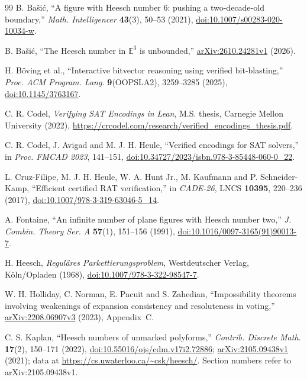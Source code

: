 \documentclass[10pt,a4paper]{article}
\theoremstyle{definition}
\theoremstyle{remark}
\begin{document}
{\raggedright\small
\begin{thebibliography}{99}
B. Ba\v{s}i\'c,
``A figure with Heesch number 6: pushing a two-decade-old boundary,''
\emph{Math. Intelligencer} \textbf{43}(3), 50--53 (2021),
\href{https://doi.org/10.1007/s00283-020-10034-w}{doi:10.1007/s00283-020-10034-w}.

B. Ba\v{s}i\'c,
``The Heesch number in $\mathbb E^3$ is unbounded,''
\href{https://arxiv.org/abs/2610.24281v1}{arXiv:2610.24281v1} (2026).

H. Böving et al.,
``Interactive bitvector reasoning using verified bit-blasting,''
\emph{Proc. ACM Program. Lang.} \textbf{9}(OOPSLA2), 3259--3285 (2025),
\href{https://doi.org/10.1145/3763167}{doi:10.1145/3763167}.

C. R. Codel,
\emph{Verifying SAT Encodings in Lean},
M.S. thesis, Carnegie Mellon University (2022),
\url{https://crcodel.com/research/verified_encodings_thesis.pdf}.

C. R. Codel, J. Avigad and M. J. H. Heule,
``Verified encodings for SAT solvers,''
in \emph{Proc. FMCAD 2023}, 141--151,
\href{https://doi.org/10.34727/2023/isbn.978-3-85448-060-0_22}{doi:10.34727/2023/isbn.978-3-85448-060-0\_22}.

L. Cruz-Filipe, M. J. H. Heule, W. A. Hunt Jr., M. Kaufmann and
P. Schneider-Kamp,
``Efficient certified RAT verification,''
in \emph{CADE-26}, LNCS \textbf{10395}, 220--236 (2017),
\href{https://doi.org/10.1007/978-3-319-63046-5_14}{doi:10.1007/978-3-319-63046-5\_14}.

A. Fontaine,
``An infinite number of plane figures with Heesch number two,''
\emph{J. Combin. Theory Ser. A} \textbf{57}(1), 151--156 (1991),
\href{https://doi.org/10.1016/0097-3165(91)90013-7}{doi:10.1016/0097-3165(91)90013-7}.

H. Heesch,
\emph{Reguläres Parkettierungsproblem},
Westdeutscher Verlag, Köln/Opladen (1968),
\href{https://doi.org/10.1007/978-3-322-98547-7}{doi:10.1007/978-3-322-98547-7}.

W. H. Holliday, C. Norman, E. Pacuit and S. Zahedian,
``Impossibility theorems involving weakenings of expansion consistency
and resoluteness in voting,''
\href{https://arxiv.org/abs/2208.06907v3}{arXiv:2208.06907v3} (2023),
Appendix~C.

C. S. Kaplan,
``Heesch numbers of unmarked polyforms,''
\emph{Contrib. Discrete Math.} \textbf{17}(2), 150--171 (2022),
\href{https://doi.org/10.55016/ojs/cdm.v17i2.72886}{doi:10.55016/ojs/cdm.v17i2.72886};
\href{https://arxiv.org/abs/2105.09438v1}{arXiv:2105.09438v1} (2021);
data at \url{https://cs.uwaterloo.ca/~csk/heesch/}.
Section numbers refer to arXiv:2105.09438v1.


\end{thebibliography}}
\end{document}
